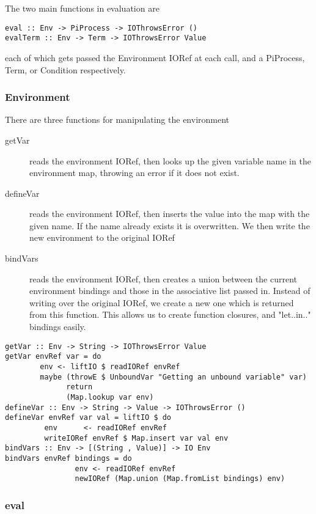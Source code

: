 The two main functions in evaluation are

\begin{verbatim}
eval :: Env -> PiProcess -> IOThrowsError () 
evalTerm :: Env -> Term -> IOThrowsError Value
\end{verbatim}

each of which gets passed the Environment IORef at each call, and a PiProcess, Term, or Condition respectively.

\subsubsection{Environment}

There are three functions for manipulating the environment
\begin{description}
    \item[getVar] reads the environment IORef, then looks up the given variable name in the environment map, throwing an error if it does not exist.
    \item[defineVar] reads the environment IORef, then inserts the value into the map with the given name. If the name already exists it is overwritten. We then write the new environment to the original IORef
    \item[bindVars] reads the environment IORef, then creates a union between the current environment bindings and those in the associative list passed in. Instead of writing over the original IORef, we create a new one which is returned from this function. This allows us to create function closures, and "let..in.." bindings easily.
\end{description}
\begin{verbatim}
getVar :: Env -> String -> IOThrowsError Value 
getVar envRef var = do 
        env <- liftIO $ readIORef envRef
        maybe (throwE $ UnboundVar "Getting an unbound variable" var)
              return
              (Map.lookup var env)
defineVar :: Env -> String -> Value -> IOThrowsError ()
defineVar envRef var val = liftIO $ do
         env      <- readIORef envRef
         writeIORef envRef $ Map.insert var val env
bindVars :: Env -> [(String , Value)] -> IO Env
bindVars envRef bindings = do
                env <- readIORef envRef
                newIORef (Map.union (Map.fromList bindings) env)
\end{verbatim}


\subsubsection{eval}

